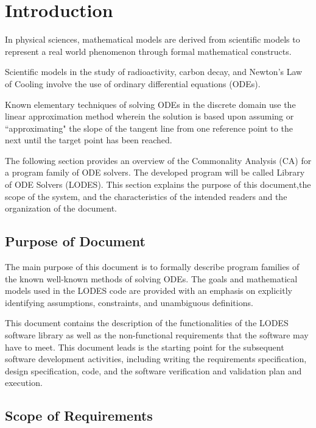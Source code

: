 \documentclass[12pt]{article}
\newcommand{\progname}{LODES} %
\begin{document}

\newpage
{}

\section{Introduction}

In physical sciences, mathematical models are derived from scientific models to
represent a real world phenomenon through formal mathematical constructs.

Scientific models in the study of radioactivity, carbon decay, and Newton's Law of Cooling
involve the use of ordinary differential equations (ODEs).

Known elementary techniques of solving ODEs in the discrete domain use the linear approximation
method wherein the solution is based upon assuming or ``approximating" the slope of the tangent
line from one reference point to the next until the target point has been reached.

The following section provides an overview of the Commonality Analysis (CA) for a program family of ODE solvers. The developed program will be
called Library of ODE Solvers (\progname{}). This section explains the purpose of this
document,the scope of the system, and the characteristics of the intended readers
and the organization of the document.

\subsection{Purpose of Document}

The main purpose of this document is to formally describe program families of
the known well-known methods of solving ODEs. The goals and mathematical models used
in the \progname{} code are provided with
an emphasis on explicitly identifying assumptions, constraints, and unambiguous definitions.

This document contains the description of the functionalities of the \progname{} software library as well
as the non-functional requirements that the software may have to meet. This document leads is the
starting point for the
subsequent software development activities, including writing the requirements specification,
design specification, code, and the software verification and validation plan and execution.

\subsection{Scope of Requirements} 
\end{document}
